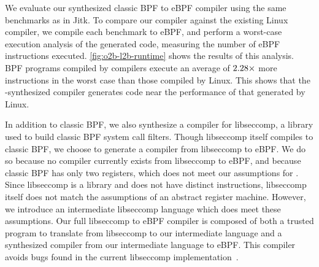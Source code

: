 We evaluate our synthesized classic BPF to eBPF compiler using the same benchmarks
as in Jitk.
%
To compare our compiler against the existing Linux compiler, we compile each
benchmark to eBPF, and perform a worst-case execution analysis of the generated
code, measuring the number of eBPF instructions executed.
%
\autoref{fig:o2b-l2b-runtime} shows the results of this analysis.
%
BPF programs compiled by \jitsynth compilers execute an average of
$2.28\times$ more instructions in the worst case than those
compiled by Linux.
%
This shows that the \jitsynth-synthesized compiler generates code
near the performance of that generated by Linux.
%


In addition to classic BPF, we also synthesize a compiler for libseccomp,
a library used to build classic BPF system call filters.
%
Though libseccomp itself compiles to classic BPF, we choose to generate a compiler from libseccomp to eBPF.
%
We do so because no compiler currently exists from libseccomp to eBPF, and because
classic BPF has only two registers, which does not meet our assumptions for \jitsynth.
%
Since libseccomp is a library and does not have distinct instructions, libseccomp itself does not match the assumptions of an abstract register machine.
%
However, we introduce an intermediate libseccomp language which does meet these assumptions.
%
Our full libseccomp to eBPF compiler is composed of both a trusted program to translate from libseccomp to our intermediate language and a synthesized compiler from our intermediate language to eBPF.
%
This compiler avoids bugs found in the current libseccomp implementation~\cite{lsc:bug}.

